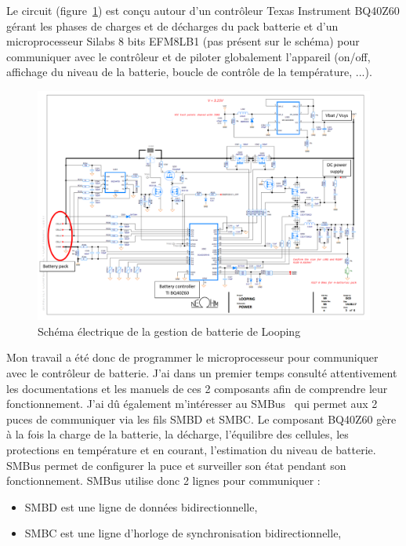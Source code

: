 \documentclass[a4paper, 12pt, sffamily]{report}
\begin{document}
Le circuit (figure~\ref{fig:looping_charger}) est conçu autour d'un contrôleur Texas Instrument BQ40Z60 gérant les phases de charges et de décharges du pack batterie et d'un microprocesseur Silabs 8 bits EFM8LB1 (pas présent sur le schéma) pour communiquer avec le contrôleur et de piloter globalement l'appareil (on/off, affichage du niveau de la batterie, boucle de contrôle de la température, ...).

\begin{figure}[h]
\centering
\includegraphics[scale=0.6]{figures/screenshots/battery_charger.png}
\caption{Schéma électrique de la gestion de batterie de Looping}
\label{fig:looping_charger}
\end{figure}

Mon travail a été donc de programmer le microprocesseur pour communiquer avec le contrôleur de batterie. J’ai dans un premier temps consulté attentivement les documentations et les manuels de ces 2 composants afin de comprendre leur fonctionnement. J’ai dû également m’intéresser au SMBus~\cite{smbus_spec} qui permet aux 2 puces de communiquer via les fils SMBD et SMBC.
Le composant BQ40Z60 gère à la fois la charge de la batterie, la décharge, l’équilibre des cellules, les protections en température et en courant, l’estimation du niveau de batterie. SMBus permet de configurer la puce et surveiller son état pendant son fonctionnement.
SMBus utilise donc 2 lignes pour communiquer :
\begin{itemize} %
\item SMBD est une ligne de données bidirectionnelle,
\item SMBC est une ligne d'horloge de synchronisation bidirectionnelle,
\end{itemize}
\end{document}
